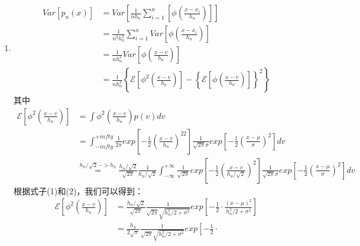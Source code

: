 \documentclass[a4paper,11pt,onecolumn,oneside,UTF8]{article}
\begin{document}
\begin{enumerate}
    \item
          $$
              \begin{aligned}
                  Var\left[p_n\left(x\right)\right]
                   & = Var\left[\frac{1}{nh_n}\sum\limits_{i=1}^n
                  \left[\phi\left(\frac{x-x_i}{h_n}\right)\right] \right] \\
                   & = \frac{1}{n^2h_n^2}\sum\limits_{i=1}^n
                  Var\left[\phi\left(\frac{x-x_i}{h_n}\right)\right]      \\
                   & = \frac{1}{nh_n^2}
                  Var\left[\phi\left(\frac{x-v}{h_n}\right)\right]        \\
                   & = \frac{1}{nh_n^2}
                  \left\{\mathcal{E}\left[\phi^2\left(\frac{x-v}{h_n}\right)\right]-
                  \left\{\mathcal{E}\left[\phi\left(\frac{x-v}{h_n}\right)\right]\right\}^2\right\}
              \end{aligned}
          $$
          其中
          $$
              \begin{aligned}
                  \mathcal{E}\left[\phi^2\left(\frac{x-v}{h_n}\right)\right]
                   & = \int \phi^2\left(\frac{x-v}{h_n}\right)p\left(v\right)dv      \\
                   & = \int_{-infty}^{+infty}\frac{1}{2\pi}
                  exp\left[-\frac{1}{2}\left(\frac{x-v}{h_n}\right)^22\right]\frac{1}{\sqrt{2\pi}\sigma}
                  exp\left[-\frac{1}{2}\left(\frac{x-\mu}{\sigma}\right)^2\right]dv  \\
                   & \overset{h_n/\sqrt{2}->h_n}{=} \frac{h_n/\sqrt{2}}{\sqrt{2\pi}}
                  \frac{1}{h_n/\sqrt{2}}\int_{-\infty}^{+\infty} \frac{1}{
                      \sqrt{2\pi}}exp\left[-\frac{1}{2}\left(\frac{x-v}{h_n/\sqrt{2}}\right)^2\right]\frac{1}
                  {\sqrt{2\pi}\sigma}exp\left[-\frac{1}{2}\left(\frac{x-\mu}{\sigma}\right)^2\right]dv
              \end{aligned}
          $$
          根据式子(1)和(2)，我们可以得到：
          $$
              \begin{aligned}
                  \mathcal{E}\left[\phi^2\left(\frac{x-v}{h_n}\right)\right]
                   & = \frac{h_n/\sqrt{2}}{\sqrt{2\pi}} \frac{1}{\sqrt{2\pi}
                      \sqrt{h_n^2/2+\sigma^2}}exp\left[-\frac{1}{2}\cdot
                  \frac{\left(x-\mu\right)^2}{h_n^2/2+\sigma^2}\right]       \\
                   & = \frac{h_n}{2\sqrt{\pi}}\frac{1}{\sqrt{2\pi}
                      \sqrt{h_n^2/2+\sigma^2}}exp\left[-\frac{1}{2}\cdot

\end{aligned}$$
\end{enumerate}
\end{document}
